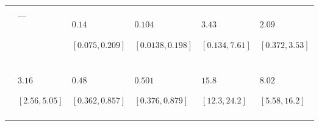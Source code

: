 \begin{table}
\begin{tabular}{>{\raggedleft\arraybackslash}m{1.2cm}>{\raggedright\arraybackslash}m{2.3cm}>{\raggedright\arraybackslash}m{2.3cm}>{\raggedright\arraybackslash}m{2.3cm}ll}
\cellcolor{blue!5!white!90!black}{$V_{\text{F}}$} & \cellcolor{gray}{$0.127$\par $[0.0924,0.166]$} & \cellcolor{gray}{---} & \cellcolor{gray}{---} & \cellcolor{gray}{---} & \cellcolor{gray}{---}\\
\cellcolor{blue!5!white!90!black}{$V_{\text{PE}}$} & --- & $0.14$\par $[0.075,0.209]$ & $0.104$\par $[0.0138,0.198]$ & $3.43$\par $[0.134,7.61]$ & $2.09$\par $[0.372,3.53]$\\
\cellcolor{blue!5!white!90!black}{$V_{\text{R}}$} & \cellcolor{gray}{$0.322$\par $[0.247,0.398]$} & \cellcolor{gray}{---} & \cellcolor{gray}{---} & \cellcolor{gray}{---} & \cellcolor{gray}{---}\\
\cellcolor{blue!5!white!90!black}{$V_{\text{P}}$} & $3.16$\par $[2.56,5.05]$ & $0.48$\par $[0.362,0.857]$ & $0.501$\par $[0.376,0.879]$ & $15.8$\par $[12.3,24.2]$ & $8.02$\par $[5.58,16.2]$\\
\cellcolor{blue!5!white!90!black}{$h^{2}$} & \cellcolor{gray}{$0.224$\par $[0.138,0.296]$} & \cellcolor{gray}{$0.185$\par $[0.0365,0.377]$} & \cellcolor{gray}{$0.282$\par $[0.078,0.544]$} & \cellcolor{gray}{$0.458$\par $[0.168,0.746]$} & \cellcolor{gray}{$0.125$\par $[7.68\text{\textsc{e-4}},0.426]$}\\
\bottomrule
\end{tabular}
\end{table}